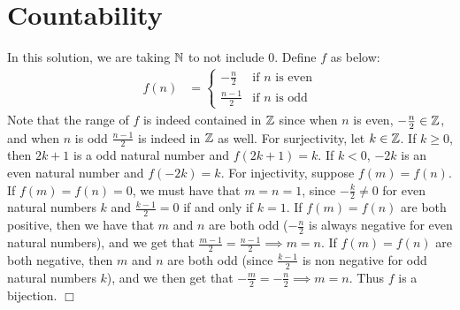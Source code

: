 \documentclass{article}
\begin{document}
\section{Countability}
 {
    In this solution, we are taking $\mathbb{N}$ to not include 0. Define $f$ as below:
    \begin{align*}
        f(n) &= \begin{cases}
            -\frac{n}{2} &\text{if $n$ is even}\\
            \frac{n-1}{2} &\text{if $n$ is odd}
        \end{cases}
    \end{align*}
    Note that the range of $f$ is indeed contained in $\mathbb{Z}$ since when $n$ is even, $-\frac{n}{2}\in \mathbb{Z}$, and when $n$ is odd $\frac{n-1}{2}$ is indeed in $\mathbb{Z}$ as well. For surjectivity, let $k\in \mathbb{Z}$. If $k \geq 0$, then $2k+1$ is a odd natural number and  $f(2k+1) = k$. If $k < 0$, $-2k$ is an even natural number and $f(-2k) = k$. For injectivity, suppose $f(m) = f(n)$. If $f(m) = f(n) = 0$, we must have that $m = n = 1$, since $-\frac{k}{2}\neq 0$ for even natural numbers $k$ and $\frac{k-1}{2} = 0$ if and only if $k = 1$. If $f(m) = f(n)$ are both positive, then we have that $m$ and $n$ are both odd ($-\frac{n}{2}$ is always negative for even natural numbers), and we get that $\frac{m-1}{2} = \frac{n-1}{2} \implies m = n$. If $f(m) = f(n)$ are both negative, then $m$ and $n$ are both odd (since $\frac{k-1}{2}$ is non negative for odd natural numbers $k$), and we then get that $-\frac{m}{2} = -\frac{n}{2}\implies m = n$. Thus $f$ is a bijection. $\Box$
}
\end{document}
